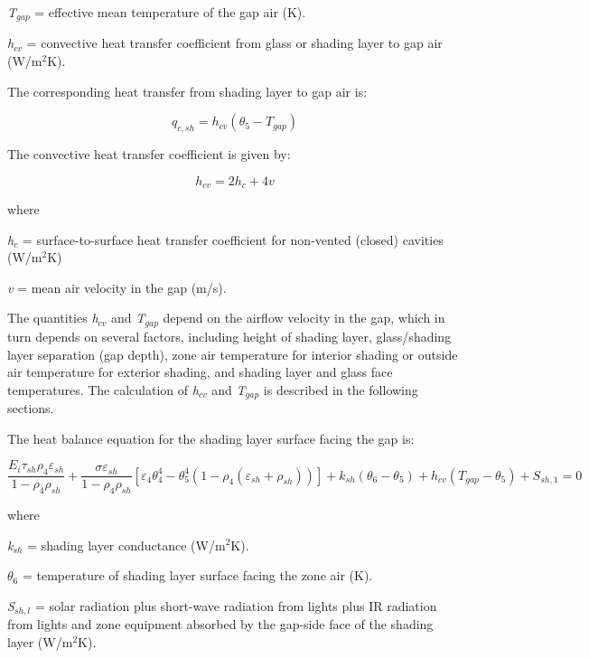\emph{T\(_{gap}\)} = effective mean temperature of the gap air (K).

\emph{h\(_{cv}\)} = convective heat transfer coefficient from glass or shading layer to gap air (W/m\(^{2}\)K).

The corresponding heat transfer from shading layer to gap air is:

\begin{equation}
{q_{c,sh}} = {h_{cv}}({\theta_5} - {T_{gap}})
\end{equation}

The convective heat transfer coefficient is given by:

\begin{equation}
{h_{cv}} = 2{h_c} + 4{v}
\label{eq:hcvConvectiveCoefficientEquation}
\end{equation}

where

\emph{h\(_{c}\)} = surface-to-surface heat transfer coefficient for non-vented (closed) cavities (W/m\(^{2}\)K)

\emph{v} = mean air velocity in the gap (m/s).

The quantities \emph{h\(_{cv}\)} and \emph{T\(_{gap}\)} depend on the airflow velocity in the gap, which in turn depends on several factors, including height of shading layer, glass/shading layer separation (gap depth), zone air temperature for interior shading or outside air temperature for exterior shading, and shading layer and glass face temperatures. The calculation of \emph{h\(_{cv}\)} and \emph{T\(_{gap}\)} is described in the following sections.

The heat balance equation for the shading layer surface facing the gap is:

\begin{equation}
\frac{E_i \tau_{sh} \rho_4 \varepsilon_{sh}} {1 - \rho_4 \rho_{sh}} +
  \frac{\sigma \varepsilon_{sh}} {1 - \rho_4 \rho_{sh}} \left[
    \varepsilon_4 \theta_4^4 - \theta_5^4 (
      1 - \rho_4(
        \varepsilon_{sh} + \rho_{sh}
      )
    )
  \right] +
  k_{sh} \left(
    \theta_6 - \theta_5
  \right) +
  h_{cv} \left(
    T_{gap} - \theta_5
  \right) +
  S_{sh,1} = 0
\end{equation}

where

\emph{k\(_{sh}\)} = shading layer conductance (W/m\(^{2}\)K).

\emph{$\theta$\(_{6}\)} = temperature of shading layer surface facing the zone air (K).

\emph{S\(_{sh,l}\)} = solar radiation plus short-wave radiation from lights plus IR radiation from lights and zone equipment absorbed by the gap-side face of the shading layer (W/m\(^{2}\)K).

